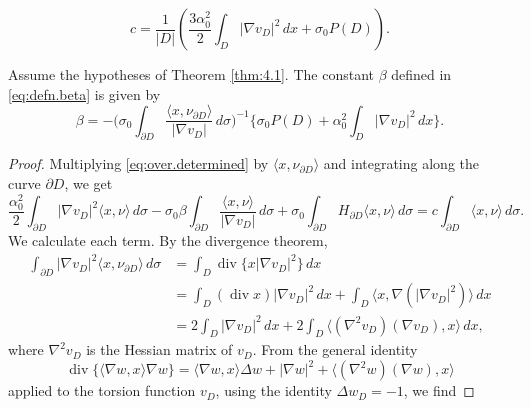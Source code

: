 \documentclass[10pt,a4paper]{amsart}
\renewcommand{\div}{\operatorname{div}} %
\newcommand{\grad}{\nabla}
\newcommand{\la}{\langle}
\newcommand{\pa}{\partial}
\newcommand{\ra}{\rangle}
\begin{document}
\begin{equation}\label{eq:constant.c}
c=\frac{1}{|D|} \left(\frac{3\alpha^2_0}{2} \int_{D} |\nabla v_D|^2\,dx +\sigma_0 P(D)  \right).
\end{equation}

\begin{lemma}\label{lem:beta}
Assume the hypotheses of Theorem \ref{thm:4.1}. 
The constant $\beta$ defined in \eqref{eq:defn.beta} is given by 
\begin{equation} \label{formula.in.lem:beta}
\beta = - \Big( \sigma_0 \int_{\pa D} \frac{\la x,\nu_{\pa D}\ra}{|\nabla v_D|} \, d\sigma \Big)^{-1} 
\Big\{ \sigma_0 P(D) + \alpha_0^2 \int_D |\nabla v_D|^2 \, dx \Big\}.
\end{equation}
\end{lemma}

\begin{proof} 
Multiplying \eqref{eq:over.determined} by $\la x,\nu_{\pa D}\ra$ 
and integrating along the curve $\pa D$, we get 
\begin{equation} \label{along.01}
\frac{\alpha_0^2}{2} \int_{\pa D} | \nabla v_D|^{2} \la x, \nu \ra \, d\sigma 
- \sigma_0 \beta \int_{\pa D} \frac{ \la x, \nu \ra }{ | \nabla v_D| } \, d\sigma
+ \sigma_0 \int_{\pa D} H_{\pa D} \la x, \nu \ra \, d\sigma
= c \int_{\pa D} \la x, \nu \ra \, d\sigma.
\end{equation}
We calculate each term. 
By the divergence theorem,
\begin{align*}
\int_{\pa D} |\nabla v_D|^2 \la x,\nu_{\pa D} \ra \, d\sigma
& = \int_D \div \{ x |\nabla v_D|^2 \} \, dx 
\\ 
& = \int_D (\div x) |\nabla v_D|^2\, dx 
+ \int_D \la x, \nabla ( |\nabla v_D|^2 ) \ra \, dx
\\ 
& = 2 \int_D |\nabla v_D |^2 \, dx 
+ 2 \int_D \la (\nabla^2 v_D) (\nabla v_D) , x \ra \, dx,
\end{align*}
where $\grad^2 v_D$ is the Hessian matrix of $v_D$. 
From the general identity
\[
\div \{ \la \grad w , x \ra \grad w \} 
= \la \grad w , x \ra \Delta w 
+ |\grad w|^2 
+ \la (\grad^2 w)(\grad w), x \ra
\]
applied to the torsion function $v_D$, using the identity $\Delta w_D = -1$, we find 

\end{proof}
\end{document}
